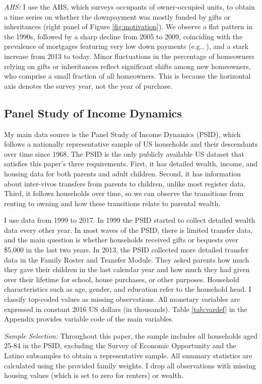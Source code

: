 \documentclass[12pt]{article}
\begin{document}
\textit{AHS:} I use the AHS, which surveys occupants of owner-occupied units, to obtain a time series on whether the downpayment was mostly funded by gifts or inheritances (right panel of Figure \ref{fig:motivation}). We observe a flat pattern in the 1990s, followed by a sharp decline from 2005 to 2009, coinciding with the prevalence of mortgages featuring very low down payments (e.g., \cite{Corbae2015}), and a stark increase from 2013 to today. Minor fluctuations in the percentage of homeowners relying on gifts or inheritances reflect significant shifts among new homeowners, who comprise a small fraction of all homeowners. This is because the horizontal axis denotes the survey year, not the year of purchase.


\subsection{Panel Study of Income Dynamics}\label{sec:PSID}
My main data source is the Panel Study of Income Dynamics (PSID), which follows a nationally representative sample of US households and their descendants over time since 1968. The PSID is the only publicly available US dataset that satisfies this paper's three requirements. First, it has detailed wealth, income, and housing data for both parents and adult children. Second, it has information about inter-vivos transfers from parents to children, unlike most register data. Third, it follows households over time, so we can observe the transitions from renting to owning and how these transitions relate to parental wealth.

I use data from 1999 to 2017. In 1999 the PSID started to collect detailed wealth data every other year. In most waves of the PSID, there is limited transfer data, and the main question is whether households received gifts or bequests over \$5,000 in the last two years. In 2013, the PSID collected more detailed transfer data in the Family Roster and Transfer Module. They asked parents how much they gave their children in the last calendar year and how much they had given over their lifetime for school, house purchases, or other purposes. Household characteristics such as age, gender, and education refer to the household head. I classify top-coded values as missing observations. All monetary variables are expressed in constant 2016 US dollars (in thousands). Table \ref{tab:vardef} in the Appendix provides variable code of the main variables.

\textit{Sample Selection:} Throughout this paper, the sample includes all households aged 25-84 in the PSID, excluding the Survey of Economic Opportunity and the Latino subsamples to obtain a representative sample. All summary statistics are calculated using the provided family weights. I drop all observations with missing housing values (which is set to zero for renters) or wealth.
\end{document}
